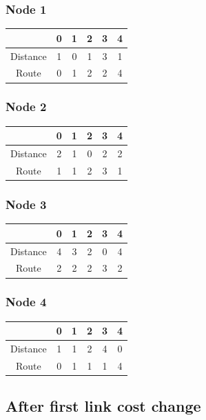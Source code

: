 \documentclass[a4paper,11pt,final]{report}
\begin{document}
\subsubsection{Node 1}

\begin{tabular}{|c|c|c|c|c|c|}
\hline
& 0 & 1 & 2 & 3 & 4 \\ \hline
Distance & 1 & 0 & 1 & 3 & 1 \\ \hline
Route & 0 & 1 & 2 & 2 & 4 \\ \hline
\end{tabular}

\subsubsection{Node 2}

\begin{tabular}{|c|c|c|c|c|c|}
\hline
& 0 & 1 & 2 & 3 & 4 \\ \hline
Distance & 2 & 1 & 0 & 2 & 2 \\ \hline
Route & 1 & 1 & 2 & 3 & 1 \\ \hline
\end{tabular}

\subsubsection{Node 3}

\begin{tabular}{|c|c|c|c|c|c|}
\hline
& 0 & 1 & 2 & 3 & 4 \\ \hline
Distance & 4 & 3 & 2 & 0 & 4 \\ \hline
Route & 2 & 2 & 2 & 3 & 2 \\ \hline
\end{tabular}

\subsubsection{Node 4}

\begin{tabular}{|c|c|c|c|c|c|}
\hline
& 0 & 1 & 2 & 3 & 4 \\ \hline
Distance & 1 & 1 & 2 & 4 & 0 \\ \hline
Route & 0 & 1 & 1 & 1 & 4 \\ \hline
\end{tabular}

\subsection{After first link cost change}
\end{document}
